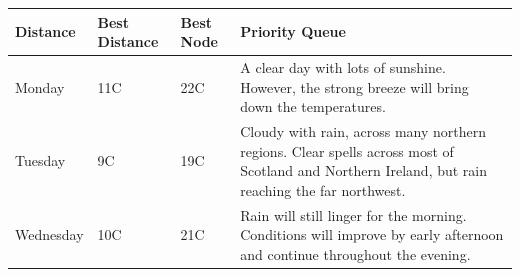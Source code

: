 \documentclass[paper=a4, fontsize=11pt]{scrartcl} %
\numberwithin{equation}{section} %
\numberwithin{figure}{section} %
\numberwithin{table}{section} %
\begin{document}
\begin{center}
    \begin{tabular}{ | l | l | l | p{6cm} |}
    \hline
    Distance & Best Distance & Best Node & Priority Queue \\ \hline
    Monday & 11C & 22C & A clear day with lots of sunshine.  
    However, the strong breeze will bring down the temperatures. \\ \hline
    
    Tuesday & 9C & 19C & Cloudy with rain, across many northern regions. 	Clear spells across most of Scotland and Northern Ireland, 
    but rain reaching the far northwest. \\ \hline
    
    Wednesday & 10C & 21C & Rain will still linger for the morning. 
    Conditions will improve by early afternoon and continue 
    throughout the evening. \\
    \hline
    \end{tabular}
\end{center}
\end{document}
